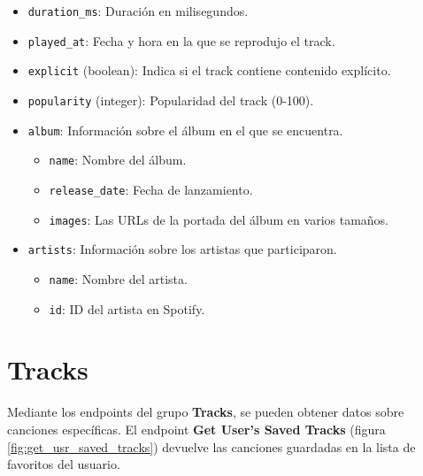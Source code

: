 \begin{itemize}
\begin{itemize}
\begin{itemize}
                        \item \texttt{duration\_ms}: Duración en milisegundos.
                        \item \texttt{played\_at}: Fecha y hora en la que se reprodujo el track.
                        \item \texttt{explicit} (boolean): Indica si el track contiene contenido explícito.
                        \item \texttt{popularity} (integer): Popularidad del track (0-100).
                        \item \texttt{album}: Información sobre el álbum en el que se encuentra.
                              \begin{itemize}
                                  \item \texttt{name}: Nombre del álbum.
                                  \item \texttt{release\_date}: Fecha de lanzamiento.
                                  \item \texttt{images}: Las URLs de la portada del álbum en varios tamaños.
                              \end{itemize}
                        \item \texttt{artists}: Información sobre los artistas que participaron.
                              \begin{itemize}
                                  \item \texttt{name}: Nombre del artista.
                                  \item \texttt{id}: ID del artista en Spotify.
                              \end{itemize}
                    \end{itemize}
          \end{itemize}
\end{itemize}

\newpage

\section*{Tracks}

Mediante los endpoints del grupo \textbf{Tracks}, se pueden obtener datos sobre canciones específicas. El endpoint \textbf{Get User's Saved Tracks} (figura \ref{fig:get_usr_saved_tracks}) devuelve las canciones guardadas en la lista de favoritos del usuario.

